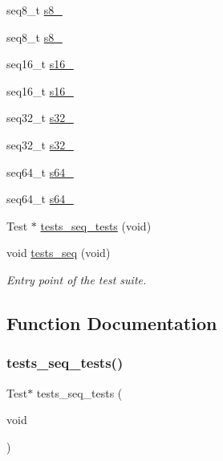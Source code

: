 \begin{DoxyCompactItemize}
\item 
seq8\+\_\+t \hyperlink{tests-seq_8c_a9ade3c73674cb8e5559068b90e82f0e5}{s8\+\_}
\item 
seq8\+\_\+t \hyperlink{tests-seq_8c_a219043358a48e66507e3307b22a4be35}{s8\+\_}
\item 
seq16\+\_\+t \hyperlink{tests-seq_8c_a1d62b80254b94d10ce1a5b781f9a6426}{s16\+\_}
\item 
seq16\+\_\+t \hyperlink{tests-seq_8c_ae26488855d0438f68f39c90d79b21edd}{s16\+\_}
\item 
seq32\+\_\+t \hyperlink{tests-seq_8c_a3af81d332b537d1e5eaa50cbd9d219ca}{s32\+\_}
\item 
seq32\+\_\+t \hyperlink{tests-seq_8c_a984261391242c9779479174f0674ceab}{s32\+\_}
\item 
seq64\+\_\+t \hyperlink{tests-seq_8c_a0393c032f00ea1bf5ca704b17f6d44bb}{s64\+\_}
\item 
seq64\+\_\+t \hyperlink{tests-seq_8c_ae13b9fa146ec1b3ec15fc85d064411fd}{s64\+\_}
\item 
Test $\ast$ \hyperlink{tests-seq_8c_af09b604c203eacf8a8abea61846fad72}{tests\+\_\+seq\+\_\+tests} (void)
\item 
void \hyperlink{group__unittests_gaad689d0f2a9566f1cc70188eabdfd24c}{tests\+\_\+seq} (void)
\begin{DoxyCompactList}\small\item\em Entry point of the test suite. \end{DoxyCompactList}\end{DoxyCompactItemize}


\subsection{Function Documentation}
\mbox{\label{tests-seq_8c_af09b604c203eacf8a8abea61846fad72}} 
\subsubsection{\texorpdfstring{tests\+\_\+seq\+\_\+tests()}{tests\_seq\_tests()}}
{\footnotesize\ttfamily Test$\ast$ tests\+\_\+seq\+\_\+tests (\begin{DoxyParamCaption}\item[{void}]{ }\end{DoxyParamCaption})}

